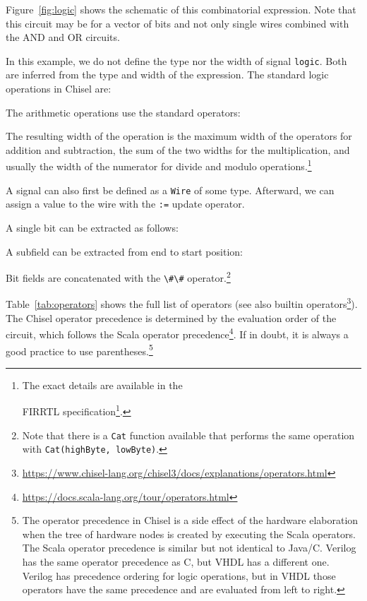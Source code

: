 \documentclass[%
    10pt,
    headinclude, footexclude,
    openright, %
    notitlepage,
    cleardoubleempty,
    headsepline,
    pointlessnumbers,
    bibtotoc, idxtotoc,
    ]{scrbook}
\newif\ifbook
\newcommand{\code}[1]{{\lstinline[basicstyle=\small\ttfamily]{#1}}}
\newcommand{\codefoot}[1]{{\lstinline[basicstyle=\footnotesize\ttfamily]{#1}}}
\newcommand{\myref}[2]{\href{#1}{#2}}
\renewcommand{\myref}[2]{{#2}{\footnote{\url{#1}}}}
\begin{document}
\noindent Figure~\ref{fig:logic} shows the schematic of this combinatorial expression.
Note that this circuit may be for a vector of bits and not only single wires
combined with the AND and OR circuits.

In this example, we do not define the type nor the width of signal \code{logic}.
Both are inferred from the type and width of the expression.
The standard logic operations in Chisel are:



\noindent The arithmetic operations use the standard operators:



\noindent The resulting width of the operation is the maximum width of the operators for
addition and subtraction, the sum of the two widths for the multiplication, and usually
the width of the numerator for divide and modulo operations.\footnote{
  The exact details are available in the
  \ifbook
    FIRRTL specification\footnotemark
  \else
    \myref{https://github.com/chipsalliance/firrtl-spec/releases/latest/download/spec.pdf}{FIRRTL specification}.
  \fi
}
\ifbook
  \footnotetext{\url{https://github.com/chipsalliance/firrtl-spec/releases/latest/download/spec.pdf}}
\fi



A signal can also first be defined as a \code{Wire} of some type. Afterward, we can assign a
value to the wire with the \code{:=} update operator.


A single bit can be extracted as follows:

\noindent A subfield can be extracted from end to start position:

\noindent Bit fields are concatenated with the \code{\#\#} operator.\footnote{Note that there is a \codefoot{Cat} function available that performs the same
operation with \codefoot{Cat(highByte, lowByte)}.}


Table~\ref{tab:operators} shows the full list of operators
(see also \myref{https://www.chisel-lang.org/chisel3/docs/explanations/operators.html}{builtin operators}).
The Chisel operator precedence is determined by the evaluation order of the circuit,
which follows the \myref{https://docs.scala-lang.org/tour/operators.html}{Scala operator precedence}.
If in doubt, it is always a good practice to use parentheses.\footnote{The operator precedence in
Chisel is a side effect of the hardware elaboration when the tree of hardware nodes
is created by executing the Scala operators. The Scala operator precedence is similar but
not identical to Java/C. Verilog has the same operator precedence as C, but VHDL
has a different one. Verilog has precedence ordering for logic operations, but in VHDL
those operators have the same precedence and are evaluated from left to right.}
\end{document}
